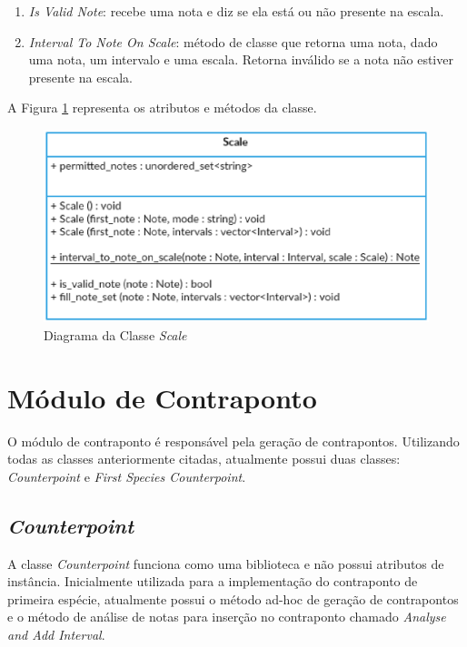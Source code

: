     \begin{enumerate}
      \item \textit{Is Valid Note}: recebe uma nota e diz se ela está ou não presente na escala.
      \item \textit{Interval To Note On Scale}: método de classe que retorna uma nota, dado uma nota, um intervalo e uma escala. Retorna inválido se a nota não estiver presente na escala.
    \end{enumerate}


    A Figura \ref{scaleclass} representa os atributos e métodos da classe.

    \begin{figure}[htb]
      \centering
      \includegraphics[scale=0.7]{figuras/scaleclass.eps}
      \caption{Diagrama da Classe \textit{Scale}}
      \label{scaleclass}
    \end{figure}

  \section[Módulo de Contraponto]{Módulo de Contraponto}

    O módulo de contraponto é responsável pela geração de contrapontos. Utilizando todas as classes anteriormente citadas, atualmente possui duas classes: \textit{Counterpoint} e  \textit{First Species Counterpoint}.

    \subsection[\textit{Counterpoint}]{\textit{Counterpoint}}

    A classe \textit{Counterpoint} funciona como uma biblioteca e não possui atributos de instância. Inicialmente utilizada para a implementação do contraponto de primeira espécie, atualmente possui o método ad-hoc de geração de contrapontos e o método de análise de notas para inserção no contraponto chamado \textit{Analyse and Add Interval}.

